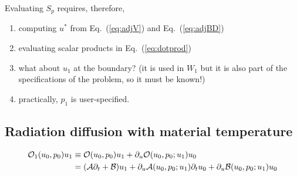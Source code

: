 \documentclass[11pt]{article}
\newcommand{\ben}{\begin{enumerate}}
\newcommand{\een}{\end{enumerate}}
\newcommand{\eqt}[1]{Eq.~(\ref{#1})}                     %
\renewcommand{\O}{\mathcal{O}}
\newcommand{\mc}[1]{\mathcal{#1}}
\newcommand{\us}{{u^\ast}}
\begin{document}
Evaluating $S_p$ requires, therefore,
\ben
\item
computing $\us$ from \eqt{eq:adjV}  and \eqt{eq:adjBD} 
\item
evaluating scalar products in \eqt{eq:dotprod}
\item
what about $u_1$ at the boundary? (it is used in $W_1$ but it is 
also part of the specifications of the problem, so it must be known!)
\item
practically, $p_1$ is user-specified.
\een

%


\subsection{Radiation diffusion with material temperature}


\begin{align}
\O_1(u_0,p_0) u_1 & \equiv \O(u_0,p_0) u_1 + \partial_u \O(u_0,p_0;u_1)  u_0 \notag \\
                  & =(\mc{A}\partial_t + \mc{B}) u_1 + \partial_u \mc{A}(u_0,p_0;u_1)  \partial_t u_0 + \partial_u \mc{B}(u_0,p_0;u_1)  u_0
\end{align}


\end{document}
